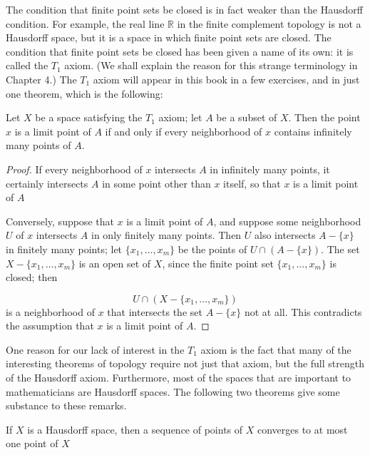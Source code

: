 The condition that finite point sets be closed is in fact weaker than the Hausdorff condition. For example, the real line \(\mathbb{R}\) in the finite complement topology is not a Hausdorff space, but it is a space in which finite point sets are closed. The condition that finite point sets be closed has been given a name of its own: it is called the \(T_{1}\) axiom. (We shall explain the reason for this strange terminology in Chapter 4.) The \(T_{1}\) axiom will appear in this book in a few exercises, and in just one theorem, which is the following:

\begin{theorem}
\label{thm:\thetheorem}
 Let \(X\) be a space satisfying the \(T_{1}\) axiom; let \(A\) be a subset of \(X\). Then the point \(x\) is a limit point of \(A\) if and only if every neighborhood of \(x\) contains infinitely many points of \(A\).
\end{theorem}

\begin{proof}
 If every neighborhood of \(x\) intersects \(A\) in infinitely many points, it certainly intersects \(A\) in some point other than \(x\) itself, so that \(x\) is a limit point of \(A\)

 Conversely, suppose that \(x\) is a limit point of \(A\), and suppose some neighborhood \(U\) of \(x\) intersects \(A\) in only finitely many points. Then \(U\) also intersects \(A - \{ x\}\) in finitely many points; let \(\{ {x_{1},\ldots,x_{m}}\}\) be the points of \(U \cap ( {A-\{ x\} })\). The set \(X - \{ {x_{1},\ldots,x_{m}}\}\) is an open set of \(X\), since the finite point set \(\{ {x_{1},\ldots,x_{m}}\}\) is closed; then

 \[
 U \cap ( {X - \{ {x_{1},\ldots,x_{m}}\} })
 \]
 is a neighborhood of \(x\) that intersects the set \(A - \{ x\}\) not at all. This contradicts the assumption that \(x\) is a limit point of \(A\).
\end{proof}

One reason for our lack of interest in the \(T_{1}\) axiom is the fact that many of the interesting theorems of topology require not just that axiom, but the full strength of the Hausdorff axiom. Furthermore, most of the spaces that are important to mathematicians are Hausdorff spaces. The following two theorems give some substance to these remarks.

\begin{theorem}
\label{thm:\thetheorem}
 If \(X\) is a Hausdorff space, then a sequence of points of \(X\) converges to at most one point of \(X\)
\end{theorem}

